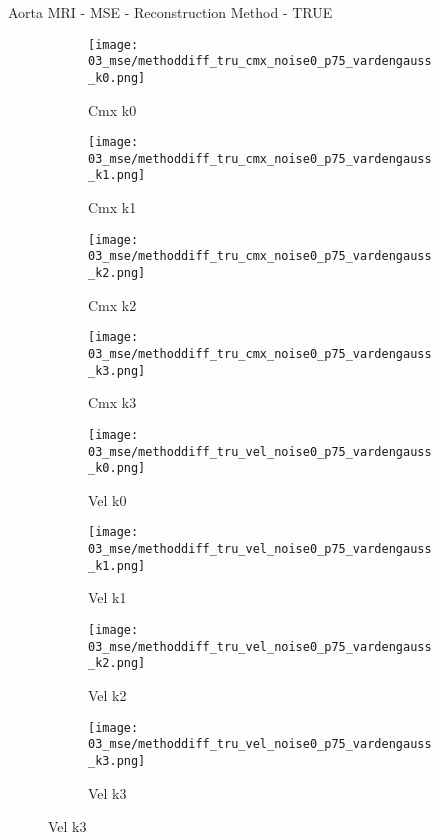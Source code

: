 \documentclass{beamer}
\begin{document}
\begin{frame}{Aorta MRI - MSE - Reconstruction Method - TRUE}{}
\begin{figure}
\begin{subfigure}{0.24\textwidth}
\texttt{[image: 03\_mse/methoddiff\_tru\_cmx\_noise0\_p75\_vardengauss\_k0.png]}
\vspace{-20pt}
\caption*{\tiny Cmx k0}
\end{subfigure}
\begin{subfigure}{0.24\textwidth}
\texttt{[image: 03\_mse/methoddiff\_tru\_cmx\_noise0\_p75\_vardengauss\_k1.png]}
\vspace{-20pt}
\caption*{\tiny Cmx k1}
\end{subfigure}
\begin{subfigure}{0.24\textwidth}
\texttt{[image: 03\_mse/methoddiff\_tru\_cmx\_noise0\_p75\_vardengauss\_k2.png]}
\vspace{-20pt}
\caption*{\tiny Cmx k2}
\end{subfigure}
\begin{subfigure}{0.24\textwidth}
\texttt{[image: 03\_mse/methoddiff\_tru\_cmx\_noise0\_p75\_vardengauss\_k3.png]}
\vspace{-20pt}
\caption*{\tiny Cmx k3}
\end{subfigure}

\begin{subfigure}{0.24\textwidth}
\texttt{[image: 03\_mse/methoddiff\_tru\_vel\_noise0\_p75\_vardengauss\_k0.png]}
\vspace{-20pt}
\caption*{\tiny Vel k0}
\end{subfigure}
\begin{subfigure}{0.24\textwidth}
\texttt{[image: 03\_mse/methoddiff\_tru\_vel\_noise0\_p75\_vardengauss\_k1.png]}
\vspace{-20pt}
\caption*{\tiny Vel k1}
\end{subfigure}
\begin{subfigure}{0.24\textwidth}
\texttt{[image: 03\_mse/methoddiff\_tru\_vel\_noise0\_p75\_vardengauss\_k2.png]}
\vspace{-20pt}
\caption*{\tiny Vel k2}
\end{subfigure}
\begin{subfigure}{0.24\textwidth}
\texttt{[image: 03\_mse/methoddiff\_tru\_vel\_noise0\_p75\_vardengauss\_k3.png]}
\vspace{-20pt}
\caption*{\tiny Vel k3}
\end{subfigure}
\end{figure}
\end{frame}
\end{document}
